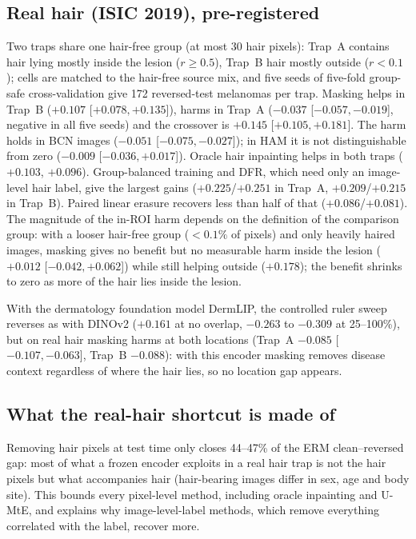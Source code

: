 \subsection{Real hair (ISIC 2019), pre-registered}
Two traps share one hair-free group (at most 30 hair pixels): Trap~A contains hair lying mostly inside the lesion
($r\ge0.5$), Trap~B hair mostly outside ($r<0.1$); cells are matched to the hair-free source mix, and five seeds
of five-fold group-safe cross-validation give 172 reversed-test melanomas per trap. Masking helps in Trap~B
($+0.107$ [$+0.078, +0.135$]), harms in Trap~A ($-0.037$ [$-0.057, -0.019$], negative in all five seeds) and the
crossover is $+0.145$ [$+0.105, +0.181$]. The harm holds in BCN images ($-0.051$ [$-0.075, -0.027$]); in HAM it
is not distinguishable from zero ($-0.009$ [$-0.036, +0.017$]). Oracle hair inpainting helps in both traps
($+0.103$, $+0.096$). Group-balanced training and DFR, which need only an image-level hair label, give the largest
gains ($+0.225$/$+0.251$ in Trap~A, $+0.209$/$+0.215$ in Trap~B). Paired linear erasure recovers less than half of
that ($+0.086$/$+0.081$). The magnitude of the in-ROI harm depends on the definition of the comparison group: with
a looser hair-free group ($<0.1\%$ of pixels) and only heavily haired images, masking gives no benefit but no
measurable harm inside the lesion ($+0.012$ [$-0.042, +0.062$]) while still helping outside ($+0.178$); the
benefit shrinks to zero as more of the hair lies inside the lesion.

With the dermatology foundation model DermLIP, the controlled ruler sweep reverses as with DINOv2 ($+0.161$ at no
overlap, $-0.263$ to $-0.309$ at 25--100\%), but on real hair masking harms at both locations (Trap~A $-0.085$
[$-0.107, -0.063$], Trap~B $-0.088$): with this encoder masking removes disease context regardless of where the hair
lies, so no location gap appears.

\subsection{What the real-hair shortcut is made of}
Removing hair pixels at test time only closes 44--47\% of the ERM clean--reversed gap: most of what a frozen
encoder exploits in a real hair trap is not the hair pixels but what accompanies hair (hair-bearing images differ in
sex, age and body site). This bounds every pixel-level method, including oracle inpainting and U-MtE, and
explains why image-level-label methods, which remove everything correlated with the label, recover more.

